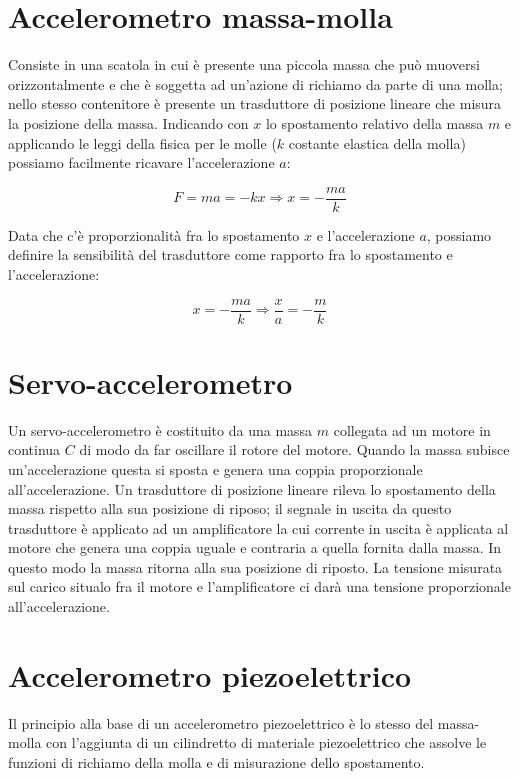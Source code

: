 \section{Accelerometro massa-molla}
Consiste in una scatola in cui è presente una piccola massa che può
muoversi orizzontalmente e che è soggetta ad un'azione di richiamo da
parte di una molla; nello stesso contenitore è presente un trasduttore
di posizione lineare che misura la posizione della massa. Indicando
con $x$ lo spostamento relativo della massa $m$ e applicando le leggi
della fisica per le molle ($k$ costante elastica della molla) possiamo
facilmente ricavare l'accelerazione $a$:

	\[F=ma=-kx \Rightarrow x=-\frac{ma}{k}\]

Data che c'è proporzionalità fra lo spostamento $x$ e l'accelerazione
$a$, possiamo definire la sensibilità del trasduttore come rapporto
fra lo spostamento e l'accelerazione:

	\[x=-\frac{ma}{k} \Rightarrow \frac{x}{a}=-\frac{m}{k}\]

\section{Servo-accelerometro}
Un servo-accelerometro è costituito da una massa $m$ collegata ad un
motore in continua $C$ di modo da far oscillare il rotore del motore.
Quando la massa subisce un'accelerazione questa si sposta e genera
una coppia proporzionale all'accelerazione. Un trasduttore di
posizione lineare rileva lo spostamento della massa rispetto alla sua
posizione di riposo; il segnale in uscita da questo trasduttore è
applicato ad un amplificatore la cui corrente in uscita è applicata
al motore che genera una coppia uguale e contraria a quella fornita
dalla massa. In questo modo la massa ritorna alla sua posizione di
riposto. La tensione misurata sul carico situalo fra il motore e
l'amplificatore ci darà una tensione proporzionale all'accelerazione.

\section{Accelerometro piezoelettrico}
Il principio alla base di un accelerometro piezoelettrico è lo stesso
del massa-molla con l'aggiunta di un cilindretto di materiale
piezoelettrico che assolve le funzioni di richiamo della molla e di
misurazione dello spostamento.

